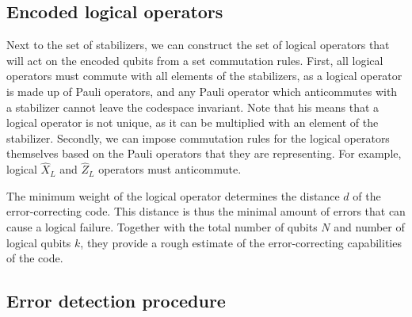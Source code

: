 \subsection{Encoded logical operators}

Next to the set of stabilizers, we can construct the set of logical operators that will act on the encoded qubits from a set commutation rules. First, all logical operators must commute with all elements of the stabilizers, as a logical operator is made up of Pauli operators, and any Pauli operator which anticommutes with a stabilizer cannot leave the codespace invariant. Note that his means that a logical operator is not unique, as it can be multiplied with an element of the stabilizer. Secondly, we can impose commutation rules for the logical operators themselves based on the Pauli operators that they are representing. For example, logical $\hat{X}_L$ and $\hat{Z}_L$ operators must anticommute.

The minimum weight of the logical operator determines the distance $d$ of the error-correcting code. This distance is thus the minimal amount of errors that can cause a logical failure. Together with the total number of qubits $N$ and number of logical qubits $k$, they provide a rough estimate of the error-correcting capabilities of the code.

\subsection{Error detection procedure}

